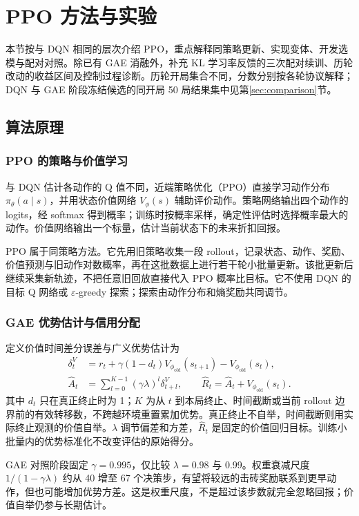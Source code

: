 \section{PPO 方法与实验}
\label{sec:ppo}
本节按与 DQN 相同的层次介绍 PPO，重点解释同策略更新、实现变体、开发选模与配对对照。除已有 GAE 消融外，补充 KL 学习率反馈的三次配对续训、历轮改动的收益区间及控制过程诊断。历轮开局集合不同，分数分别按各轮协议解释；DQN 与 GAE 阶段冻结候选的同开局 50 局结果集中见第\ref{sec:comparison}节。

\subsection{算法原理}
\subsubsection{PPO 的策略与价值学习}
与 DQN 估计各动作的 Q 值不同，近端策略优化（PPO）直接学习动作分布 $\pi_\theta(a\mid s)$，并用状态价值网络 $V_\phi(s)$ 辅助评价动作。策略网络输出四个动作的 logits，经 softmax 得到概率；训练时按概率采样，确定性评估时选择概率最大的动作。价值网络输出一个标量，估计当前状态下的未来折扣回报。

PPO 属于同策略方法。它先用旧策略收集一段 rollout，记录状态、动作、奖励、价值预测与旧动作对数概率，再在这批数据上进行若干轮小批量更新。该批更新后继续采集新轨迹，不把任意旧回放直接代入 PPO 概率比目标。它不使用 DQN 的目标 Q 网络或 $\varepsilon$-greedy 探索；探索由动作分布和熵奖励共同调节。

\subsubsection{GAE 优势估计与信用分配}
定义价值时间差分误差与广义优势估计为
\begin{align}
 \delta_t^V &= r_t+\gamma(1-d_t)V_{\phi_{\mathrm{old}}}(s_{t+1})-V_{\phi_{\mathrm{old}}}(s_t),\\
 \widehat A_t &= \sum_{l=0}^{K-1}(\gamma\lambda)^l\delta_{t+l}^V,
 \qquad \widehat R_t=\widehat A_t+V_{\phi_{\mathrm{old}}}(s_t).
\end{align}
其中 $d_t$ 只在真正终止时为 1；$K$ 为从 $t$ 到本局终止、时间截断或当前 rollout 边界前的有效转移数，不跨越环境重置累加优势。真正终止不自举，时间截断则用实际终止观测的价值自举。$\lambda$ 调节偏差和方差，$\widehat R_t$ 是固定的价值回归目标。训练小批量内的优势标准化不改变评估的原始得分。

GAE 对照阶段固定 $\gamma=0.995$，仅比较 $\lambda=0.98$ 与 0.99。权重衰减尺度 $1/(1-\gamma\lambda)$ 约从 40 增至 67 个决策步，有望将较远的击砖奖励联系到更早动作，但也可能增加优势方差。这是权重尺度，不是超过该步数就完全忽略回报；价值自举仍参与长期估计。

